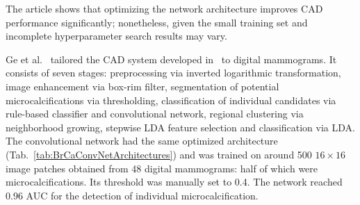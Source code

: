 The article shows that optimizing the network architecture improves CAD performance significantly; nonetheless, given the small training set and incomplete hyperparameter search results may vary. 





\begin{comment}
- Like Gurcan2002 but slightly changed for digital mammography
- six stages
- trained on manually sleected miucrocalcifications and some selected by the CAD which were not  microcalcifications
- threshold chosen by training as 0.4 to remove signals with low CNN scores
\end{comment}
Ge et al.~\cite{Ge2006} tailored the CAD system developed in~\cite{Gurcan2002} to digital mammograms.
It consists of seven stages: preprocessing via inverted logarithmic transformation, image enhancement via box-rim filter, segmentation of potential microcalcifications via thresholding, classification of individual candidates via rule-based classifier and convolutional network, regional clustering via neighborhood growing, stepwise LDA feature selection and classification via LDA. The convolutional network had the same optimized architecture (Tab.~\ref{tab:BrCaConvNetArchitectures}) and was trained on around 500 $16 \times 16$ image patches obtained from 48 digital mammograms: half of which were microcalcifications. Its threshold was manually set to 0.4. The network reached 0.96 AUC for the detection of individual microcalcification. 

